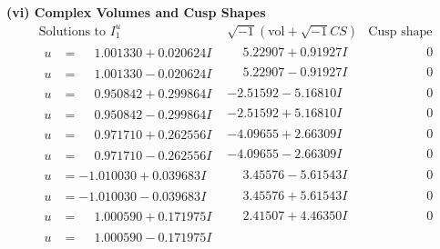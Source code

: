 \documentclass[1p]{elsarticle_modified}
\theoremstyle{definition}
\newcommand{\I}{\sqrt{-1}}
\begin{document}
\newpage\flushleft \textbf{(vi) Complex Volumes and Cusp Shapes}
$$\begin{array}{c|c|c}  
\text{Solutions to }I^u_{1}& \I (\text{vol} + \sqrt{-1}CS) & \text{Cusp shape}\\
 \hline 
\begin{aligned}
u &= \phantom{-}1.001330 + 0.020624 I\end{aligned}
 & \phantom{-}5.22907 + 0.91927 I & \phantom{-0.000000 } 0 \\ \hline\begin{aligned}
u &= \phantom{-}1.001330 - 0.020624 I\end{aligned}
 & \phantom{-}5.22907 - 0.91927 I & \phantom{-0.000000 } 0 \\ \hline\begin{aligned}
u &= \phantom{-}0.950842 + 0.299864 I\end{aligned}
 & -2.51592 - 5.16810 I & \phantom{-0.000000 } 0 \\ \hline\begin{aligned}
u &= \phantom{-}0.950842 - 0.299864 I\end{aligned}
 & -2.51592 + 5.16810 I & \phantom{-0.000000 } 0 \\ \hline\begin{aligned}
u &= \phantom{-}0.971710 + 0.262556 I\end{aligned}
 & -4.09655 + 2.66309 I & \phantom{-0.000000 } 0 \\ \hline\begin{aligned}
u &= \phantom{-}0.971710 - 0.262556 I\end{aligned}
 & -4.09655 - 2.66309 I & \phantom{-0.000000 } 0 \\ \hline\begin{aligned}
u &= -1.010030 + 0.039683 I\end{aligned}
 & \phantom{-}3.45576 - 5.61543 I & \phantom{-0.000000 } 0 \\ \hline\begin{aligned}
u &= -1.010030 - 0.039683 I\end{aligned}
 & \phantom{-}3.45576 + 5.61543 I & \phantom{-0.000000 } 0 \\ \hline\begin{aligned}
u &= \phantom{-}1.000590 + 0.171975 I\end{aligned}
 & \phantom{-}2.41507 + 4.46350 I & \phantom{-0.000000 } 0 \\ \hline\begin{aligned}
u &= \phantom{-}1.000590 - 0.171975 I\end{aligned}

\end{array}$$
\end{document}
